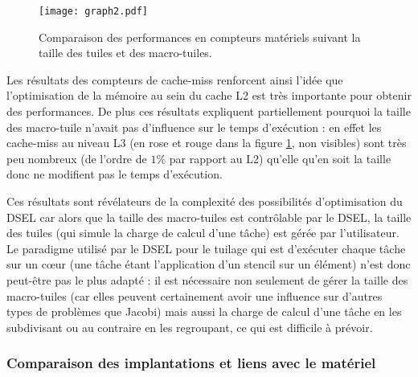 \begin{figure}[!h]
  \caption{Comparaison des performances en compteurs matériels suivant la taille des tuiles et des macro-tuiles.}
  \label{graph:comp_tuile_cmiss}
  \texttt{[image: graph2.pdf]}
\end{figure}

Les résultats des compteurs de cache-miss renforcent ainsi l'idée que l'optimisation de la mémoire au sein du cache L2 est très importante pour obtenir des performances. De plus ces résultats expliquent partiellement pourquoi la taille des macro-tuile n'avait pas d'influence sur le temps d'exécution : en effet les cache-miss au niveau L3 (en rose et rouge dans la figure \ref{graph:comp_tuile_cmiss}, non visibles) sont très peu nombreux (de l'ordre de $1\%$ par rapport au L2) qu'elle qu'en soit la taille donc ne modifient pas le temps d'exécution.

Ces résultats sont révélateurs de la complexité des possibilités d'optimisation du DSEL car alors que la taille des macro-tuiles est contrôlable par le DSEL, la taille des tuiles (qui simule la charge de calcul d'une tâche) est gérée par l'utilisateur. Le paradigme utilisé par le DSEL pour le tuilage qui est d'exécuter chaque tâche sur un cœur (une tâche étant l'application d'un stencil sur un élément) n'est donc peut-être pas le plus adapté : il est nécessaire non seulement de gérer la taille des macro-tuiles (car elles peuvent certainement avoir une influence sur d'autres types de problèmes que Jacobi) mais aussi la charge de calcul d'une tâche en les subdivisant ou au contraire en les regroupant, ce qui est difficile à prévoir.


\subsubsection*{Comparaison des implantations et liens avec le matériel}

